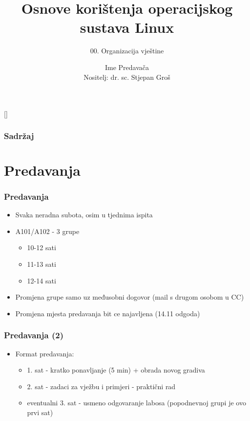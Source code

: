 \documentclass{beamer}
\title{Osnove korištenja operacijskog sustava Linux}
\subtitle{00. Organizacija vještine}
\author[Ime Predavača]{Ime Predavača\\{\small Nositelj: dr. sc. Stjepan Groš}}
\institute[FER]{Sveučilište u Zagrebu \\
				Fakultet elektrotehnike i računarstva}
\date{\todayiso}
\begin{document}
{
[] %

\begin{frame}
\maketitle
\end{frame}
}

\begin{frame}
\frametitle{Sadržaj}
\tableofcontents
\end{frame}

\section{Predavanja}
\begin{frame}[t]
\frametitle{Predavanja}
\begin{itemize}
	\item Svaka neradna subota, osim u tjednima ispita
	\item A101/A102 - 3 grupe 
	\begin{itemize}
		\item 10-12 sati
    \item 11-13 sati
		\item 12-14 sati
	\end{itemize}
\item Promjena grupe samo uz međusobni dogovor (mail s drugom osobom u CC)
\item Promjena mjesta predavanja bit ce najavljena (14.11 odgoda)
\end{itemize}
\end{frame}

\begin{frame}[t]
\frametitle{Predavanja (2)}
\begin{itemize}
	\item Format predavanja:
	\begin{itemize}
		\item 1. sat - kratko ponavljanje (5 min) + obrada novog gradiva
		\item 2. sat - zadaci za vježbu i primjeri - praktični rad
		\item eventualni 3. sat - usmeno odgovaranje labosa (popodnevnoj grupi je ovo prvi sat)
	\end{itemize}
\end{itemize}
\end{frame}
\end{document}

